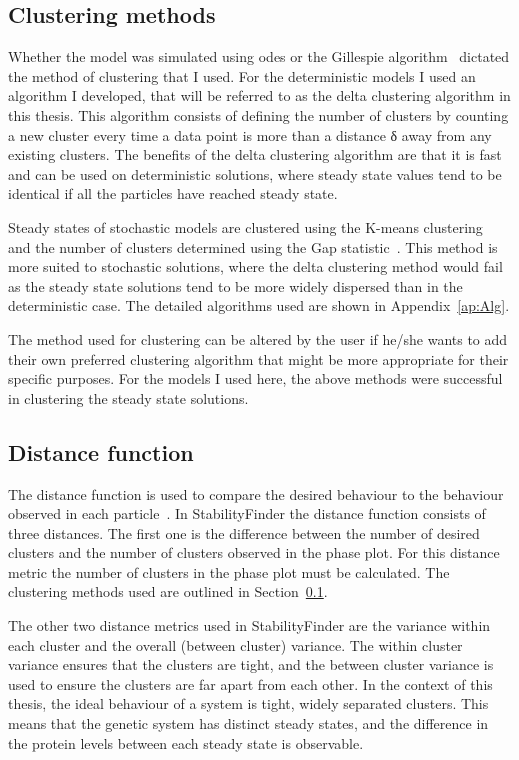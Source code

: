 \subsection{Clustering methods}
\label{Clustering methods}

Whether the model was simulated using \acrshort{ode}s or the Gillespie algorithm~\autocite{Gillespie:1977ww} dictated the method of clustering that I used. For the deterministic models I used an algorithm I developed, that will be referred to as the delta clustering algorithm in this thesis. This algorithm consists of defining the number of clusters by counting a new cluster every time a data point is more than a distance δ away from any existing clusters. The benefits of the delta clustering algorithm are that it is fast and can be used on deterministic solutions, where steady state values tend to be identical if all the particles have reached steady state.

Steady states of stochastic models are clustered using the K-means clustering~\autocite{Lloyd:1982wn} and the number of clusters determined using the Gap statistic~\autocite{Tibshirani:2001vo}. This method is more suited to stochastic solutions, where the delta clustering method would fail as the steady state solutions tend to be more widely dispersed than in the deterministic case. The detailed algorithms used are shown in Appendix~\ref{ap:Alg}. 

The method used for clustering can be altered by the user if he/she wants to add their own preferred clustering algorithm that might be more appropriate for their specific purposes. For the models I used here, the above methods were successful in clustering the steady state solutions. 

\subsection{Distance function}
\label{sec:dist}
 The distance function is used to compare the desired behaviour to the behaviour observed in each particle~\autocite{Toni:2009tr}. In StabilityFinder the distance function consists of three distances. The first one is the difference between the number of desired clusters and the number of clusters observed in the phase plot. For this distance metric the number of clusters in the phase plot must be calculated. The clustering methods used are outlined in Section~\ref{Clustering methods}.
 
 The other two distance metrics used in StabilityFinder are the variance within each cluster and the overall (between cluster) variance. The within cluster variance ensures that the clusters are tight, and the between cluster variance is used to ensure the clusters are far apart from each other. In the context of this thesis, the ideal behaviour of a system is tight, widely separated clusters. This means that the genetic system has distinct steady states, and the difference in the protein levels between each steady state is observable.

